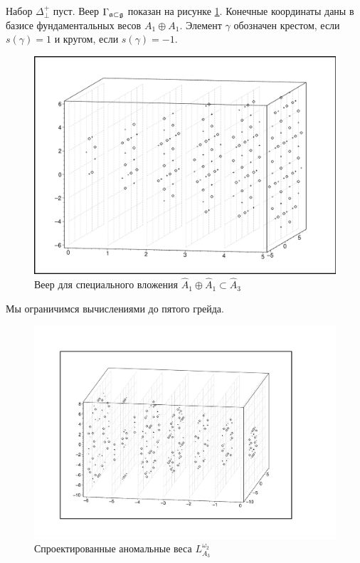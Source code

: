 \documentclass[a4paper,12pt]{article}
\theoremstyle{definition} \newtheorem{Def}{Definition}
\begin{document}
Набор $\Delta^{+}_{\bot}$ пуст.
Веер  $\Gamma _{\frak{a}\subset \frak{g}}$ показан на рисунке \ref{fig:A1+A1-A3_fan}. Конечные координаты
даны в базисе фундаментальных весов $A_1 \oplus A_1$. Элемент $\gamma$ обозначен крестом, если
$s(\gamma)=1$ и кругом, если $s(\gamma)=-1$.
\begin{figure}[h!tb]
  \includegraphics[width=150mm]{A1+A1-A3_fan.pdf}
  \caption{Веер для специального вложения $\hat A_1\oplus\hat A_1\subset\hat A_3$}
  \label{fig:A1+A1-A3_fan}
\end{figure}

Мы ограничимся вычислениями до пятого грейда.
\begin{figure}[h!tb]
  \includegraphics[width=170mm]{A1+A1-A3_anom.pdf}
  \caption{Спроектированные аномальные веса $L^{\omega_2}_{A_3}$}
  \label{fig:A1+A1-A3_anom}
\end{figure}
\end{document}
